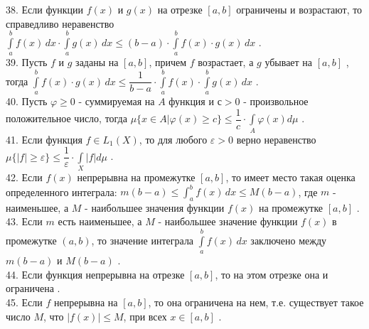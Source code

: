 \documentclass[12pt]{article}
\begin{document}
38. Если функции ${\displaystyle f(x)}$ и ${\displaystyle g(x)}$ на отрезке ${\displaystyle [a,b]}$ ограничены и возрастают, то справедливо неравенство ${\displaystyle \int \limits _{a}^{b} f(x)\,dx \cdot \int \limits _{a}^{b} g(x)\,dx \leq (b-a)\cdot \int \limits _{a}^{b} f(x)\cdot g(x)\,dx}$ .\\

39. Пусть ${\displaystyle f}$ и ${\displaystyle g}$ заданы на ${\displaystyle [a,b]}$, причем ${\displaystyle f}$ возрастает, а ${\displaystyle g}$ убывает на ${\displaystyle [a,b]}$ , тогда ${\displaystyle \int \limits _{a}^{b} f(x) \cdot g(x)\,dx \leq \dfrac{1}{b-a}\cdot \int \limits _{a}^{b} f(x)\cdot \int \limits _{a}^{b} g(x)\,dx}$ .\\

40. Пусть ${\displaystyle \varphi \geq 0}$ - суммируемая на ${\displaystyle A}$ функция и ${\displaystyle с>0}$ - произвольное положительное число, тогда ${\displaystyle \mu\{x \in A \vert \varphi(x) \geq c\} \leq \dfrac{1}{c} \cdot \int \limits _{A} \varphi(x)d\mu}$ .\\

41. Если функция ${\displaystyle f \in L_1(X)}$, то для любого ${\displaystyle \varepsilon>0}$ верно неравенство ${\displaystyle \mu\{|f| \geq \varepsilon\} \leq \dfrac{1}{\varepsilon}\cdot \int \limits _{X} |f|d\mu}$ .\\

42. Если ${\displaystyle f(x)}$ непрерывна на промежутке ${\displaystyle [a,b]}$, то имеет место такая оценка определенного интеграла: ${\displaystyle m(b-a)\leq \int _{a}^{b} f(x)\,dx\leq M(b-a)}$, где ${\displaystyle m}$ - наименьшее, а ${\displaystyle M}$ - наибольшее значения функции ${\displaystyle f(x)}$ на промежутке ${\displaystyle [a,b]}$ .\\

43. Если ${\displaystyle m}$ есть наименьшее, а ${\displaystyle M}$ - наибольшее значение функции ${\displaystyle f(x)}$ в промежутке ${\displaystyle (a,b)}$, то значение интеграла ${\displaystyle \int \limits _{a}^{b} f(x)\,dx}$ заключено между ${\displaystyle m(b-a)}$ и ${\displaystyle M(b-a)}$ .\\

44. Если функция непрерывна на отрезке  ${\displaystyle [a,b]}$, то на этом отрезке она и ограничена .\\

45. Если ${\displaystyle f}$ непрерывна на ${\displaystyle [a,b]}$, то она ограничена на нем, т.е. существует такое число ${\displaystyle M}$, что ${\displaystyle |f(x)| \leq M}$, при всех ${\displaystyle x \in [a,b]}$ .\\
\end{document}
